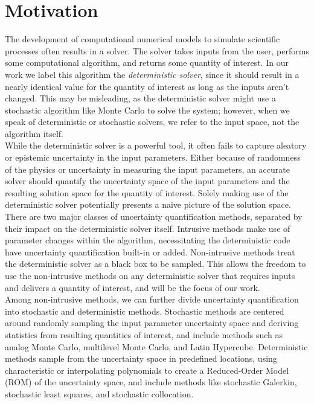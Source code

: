 \documentclass{mc2015}
\begin{document}
\section{Motivation}
The development of computational numerical models to simulate scientific processes often results in a solver. The solver takes inputs from the user, performs some computational algorithm, and returns some quantity of interest.  In our work we label this algorithm the \emph{deterministic solver}, since it should result in a nearly identical value for the quantity of interest as long as the inputs aren't changed.  This may be misleading, as the deterministic solver might use a stochastic algorithm like Monte Carlo to solve the system; however, when we speak of deterministic or stochastic solvers, we refer to the input space, not the algorithm itself.  \\

While the deterministic solver is a powerful tool, it often fails to capture aleatory or epistemic uncertainty in the input parameters.  Either because of randomness of the physics or uncertainty in measuring the input parameters, an accurate solver should quantify the uncertainty space of the input parameters and the resulting solution space for the quantity of interest.  Solely making use of the deterministic solver potentially presents a naive picture of the solution space.\\

There are two major classes of uncertainty quantification methods, separated by their impact on the deterministic solver itself.  Intrusive methods make use of parameter changes within the algorithm, necessitating the deterministic code have uncertainty quantification built-in or added.  Non-intrusive methods treat the deterministic solver as a black box to be sampled.  This allows the freedom to use the non-intrusive methods on any deterministic solver that requires inputs and delivers a quantity of interest, and will be the focus of our work.\\

Among non-intrusive methods, we can further divide uncertainty quantification into stochastic and deterministic methods.  Stochastic methods are centered around randomly sampling the input parameter uncertainty space and deriving statistics from resulting quantities of interest, and include methods such as analog Monte Carlo, multilevel Monte Carlo, and Latin Hypercube.  Deterministic methods sample from the uncertainty space in predefined locations, using characteristic or interpolating polynomials to create a Reduced-Order Model (ROM) of the uncertainty space, and include methods like stochastic Galerkin, stochastic least squares, and stochastic collocation. \\
\end{document}

